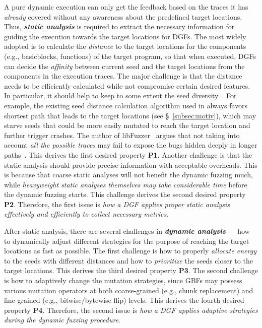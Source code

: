 A pure dynamic execution can only get the feedback based on the traces it has \emph{already} covered without any awareness about the predefined target locations.
Thus, \textbf{\emph{static analysis}} is required to extract the necessary information for guiding the execution towards the target locations for DGFs. The most widely adopted is to calculate the \emph{distance} to the target locations for the components (e.g., basicblocks, functions) of the target program, so that when executed, DGFs can decide the \emph{affinity} between current seed and the target locations from the components in the execution traces. 
The major challenge is that the distance needs to be efficiently calculated while not compromise certain desired features.
In particular, it should help to keep to some extent the seed diversity~\cite{Audibert09}.
For example, the existing seed distance calculation algorithm used in \aflgo always favors shortest path that leads to the target locations (see \S~\ref{subsec:motiv}), which may starve seeds that could be more easily mutated to reach the target location and further trigger crashes.
The author of libFuzzer~\cite{libfuzzer} argues that not taking into account \emph{all the possible traces} may fail to expose the bugs hidden deeply in longer paths~\cite{kcc_aflgo}.
This derives the first desired property \textbf{P1}.
Another challenge is that the static analysis should provide precise information with acceptable overheads.
This is because that coarse static analyses will not benefit the dynamic fuzzing much, while \emph{heavyweight static analyses themselves may take considerable time} before the dynamic fuzzing starts.
This challenge derives the second desired property \textbf{P2}.
Therefore, the first issue is \emph{how a DGF applies proper static analysis effectively and efficiently to collect necessary metrics}.

After static analysis, there are several  challenges in \textbf{\emph{dynamic analysis}} --- how to dynamically adjust different strategies for the purpose of reaching the target locations as fast as possible.
The first challenge is how to properly \emph{allocate energy} to the seeds with different distances and how to \emph{prioritize} the seeds closer to the target locations.
This derives the third desired property \textbf{P3}.
The second challenge is how to adaptively change the mutation strategies, since GBFs may possess various mutation operators at both coarse-grained (e.g., chunk replacement) and fine-grained (e.g., bitwise/bytewise flip) levels.
 This derives the fourth desired property \textbf{P4}.
Therefore, the second issue is \emph{how a DGF applies adaptive strategies during the dynamic fuzzing procedure}.


